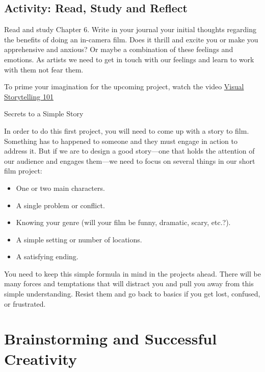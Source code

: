 \documentclass[
]{book}
\providecommand{\tightlist}{%
  \setlength{\itemsep}{0pt}\setlength{\parskip}{0pt}}
\begin{document}
\hypertarget{activity-read-study-and-reflect}{%
\subsection*{Activity: Read, Study and Reflect}\label{activity-read-study-and-reflect}}

\begin{reflect}
Read and study Chapter 6. Write in your journal your initial thoughts regarding the benefits of doing an in-camera film. Does it thrill and excite you or make you apprehensive and anxious? Or maybe a combination of these feelings and emotions. As artists we need to get in touch with our feelings and learn to work with them not fear them.

To prime your imagination for the upcoming project, watch the video \href{https://www.youtube.com/watch?v=iWQQgZh9EyE}{Visual Storytelling 101}
\end{reflect}

{ Secrets to a Simple Story}

In order to do this first project, you will need to come up with a story to film. Something has to happened to someone and they must engage in action to address it. But if we are to design a good story---one that holds the attention of our audience and engages them---we need to focus on several things in our short film project:

\begin{itemize}
\tightlist
\item
  One or two main characters.\\
\item
  A single problem or conflict.\\
\item
  Knowing your genre (will your film be funny, dramatic, scary, etc.?).\\
\item
  A simple setting or number of locations.\\
\item
  A satisfying ending.
\end{itemize}

You need to keep this simple formula in mind in the projects ahead. There will be many forces and temptations that will distract you and pull you away from this simple understanding. Resist them and go back to basics if you get lost, confused, or frustrated.

\hypertarget{brainstorming-and-successful-creativity}{%
\section{Brainstorming and Successful Creativity}\label{brainstorming-and-successful-creativity}}
\end{document}
